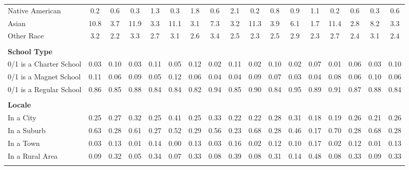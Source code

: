 \begin{tabular*}{\linewidth}{@{\extracolsep{\fill} } lcccccccccccccccc}
\hspace{0.2cm}Native American&0.2&0.6&0.3&1.3&0.3&1.8&0.6&2.1&0.2&0.8&0.9&1.1&0.2&0.6&0.3&0.6\\%
\hspace{0.2cm}Asian&10.8&3.7&11.9&3.3&11.1&3.1&7.3&3.2&11.3&3.9&6.1&1.7&11.4&2.8&8.2&3.3\\%
\hspace{0.2cm}Other Race&3.2&2.2&3.3&2.7&3.1&2.6&3.4&2.5&2.3&2.5&2.9&2.3&2.7&2.4&3.1&2.4\\%
&&&&&&&&&&&&&&&&\\%
\multicolumn{17}{l}{\bfseries School Type}\\%
\hspace{0.2cm}0/1 is a Charter School&0.03&0.10&0.03&0.11&0.05&0.12&0.02&0.11&0.02&0.10&0.02&0.07&0.01&0.06&0.03&0.10\\%
\hspace{0.2cm}0/1 is a Magnet School&0.11&0.06&0.09&0.05&0.12&0.06&0.04&0.04&0.09&0.07&0.03&0.04&0.08&0.06&0.10&0.06\\%
\hspace{0.2cm}0/1 is a Regular School&0.86&0.85&0.88&0.84&0.84&0.82&0.94&0.85&0.90&0.84&0.95&0.89&0.91&0.87&0.88&0.84\\%
&&&&&&&&&&&&&&&&\\%
\multicolumn{17}{l}{\bfseries Locale}\\%
\hspace{0.2cm}In a City&0.25&0.27&0.32&0.25&0.41&0.25&0.33&0.22&0.22&0.28&0.31&0.18&0.19&0.26&0.21&0.26\\%
\hspace{0.2cm}In a Suburb&0.63&0.28&0.61&0.27&0.52&0.29&0.56&0.23&0.68&0.28&0.46&0.17&0.70&0.28&0.68&0.28\\%
\hspace{0.2cm}In a Town&0.03&0.13&0.01&0.14&0.00&0.13&0.03&0.16&0.02&0.12&0.10&0.17&0.02&0.12&0.01&0.13\\%
\hspace{0.2cm}In a Rural Area&0.09&0.32&0.05&0.34&0.07&0.33&0.08&0.39&0.08&0.31&0.14&0.48&0.08&0.33&0.09&0.33\\%
&&&&&&&&&&&&&&&&\\%
\hline%
\end{tabular*}